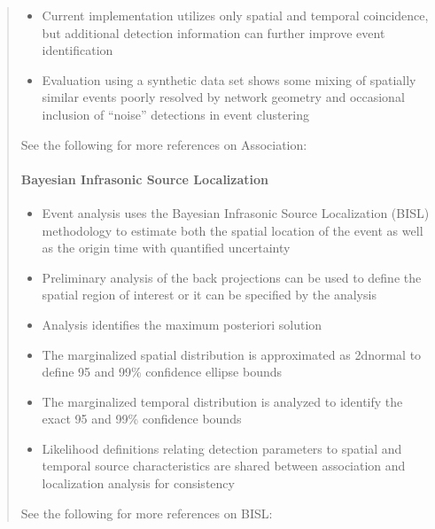 \documentclass[letterpaper,10pt,english]{sphinxmanual}
\begin{document}
\begin{itemize}
\begin{quote}
\begin{itemize}
\item {} 
Current implementation utilizes only spatial and temporal coincidence, but additional detection information can further improve event identification

\item {} 
Evaluation using a synthetic data set shows some mixing of spatially similar events poorly resolved by network geometry and occasional inclusion of “noise” detections in event clustering

\end{itemize}

See the following for more references on Association:


\paragraph{Bayesian Infrasonic Source Localization}
\label{\detokenize{localization:bayesian-infrasonic-source-localization}}\label{\detokenize{localization:localization}}\label{\detokenize{localization::doc}}\begin{itemize}
\item {} 
Event analysis uses the Bayesian Infrasonic Source Localization (BISL) methodology to estimate both the spatial location of the event as well as the origin time with quantified uncertainty

\item {} 
Preliminary analysis of the back projections can be used to define the spatial region of interest or it can be specified by the analysis

\item {} 
Analysis identifies the maximum posteriori solution

\item {} 
The marginalized spatial distribution is approximated as 2d\sphinxhyphen{}normal to define 95 and 99\% confidence ellipse bounds

\item {} 
The marginalized temporal distribution is analyzed to identify the exact 95 and 99\% confidence bounds

\item {} 
Likelihood definitions relating detection parameters to spatial and temporal source characteristics are shared between association and localization analysis for consistency

\end{itemize}

See the following for more references on BISL:
\end{quote}

\end{itemize}
\end{document}
